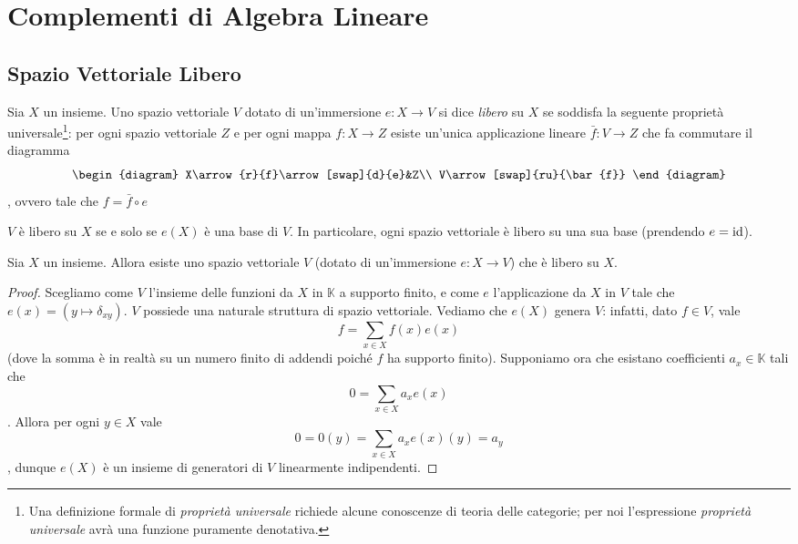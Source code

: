 \chapter{Complementi di Algebra Lineare}

\section{Spazio Vettoriale Libero}

\begin{definition}
Sia $X$ un insieme. Uno spazio vettoriale $V$ dotato di un'immersione $e:X\to V$ si dice \emph{libero} su $X$ se soddisfa la seguente proprietà universale\footnote{Una definizione formale di \emph{proprietà universale} richiede alcune conoscenze di teoria delle categorie; per noi l'espressione \emph{proprietà universale} avrà una funzione puramente denotativa.}: per ogni spazio vettoriale $Z$ e per ogni mappa $f:X\to Z$ esiste un'unica applicazione lineare $\bar{f}:V\to Z$ che fa commutare il diagramma
$$
\begin{diagram}
X\arrow{r}{f}\arrow[swap]{d}{e}&Z\\
V\arrow[swap]{ru}{\bar{f}}
\end{diagram}
$$
, ovvero tale che $f=\bar{f}\circ e$
\end{definition}

\begin{remark}
$V$ è libero su $X$ se e solo se $e(X)$ è una base di $V$. In particolare, ogni spazio vettoriale è libero su una sua base (prendendo $e=\operatorname{id}$).
\end{remark}

\begin{proposition}
Sia $X$ un insieme. Allora esiste uno spazio vettoriale $V$ (dotato di un'immersione $e:X\to V$) che è libero su $X$.
\end{proposition}
\begin{proof}
Scegliamo come $V$ l'insieme delle funzioni da $X$ in $\mathbb{K}$ a supporto finito, e come $e$ l'applicazione da $X$ in $V$ tale che $e(x)=(y\mapsto\delta_{xy})$. $V$ possiede una naturale struttura di spazio vettoriale. Vediamo che $e(X)$ genera $V$: infatti, dato $f\in V$, vale
$$
f=\sum_{x\in X}f(x)e(x)
$$
(dove la somma è in realtà su un numero finito di addendi poiché $f$ ha supporto finito). Supponiamo ora che esistano coefficienti $a_x\in\mathbb{K}$ tali che
$$
0=\sum_{x\in X}a_xe(x)
$$
. Allora per ogni $y\in X$ vale
$$
0=0(y)=\sum_{x\in X}a_xe(x)(y)=a_y
$$
, dunque $e(X)$ è un insieme di generatori di $V$ linearmente indipendenti.
\end{proof}

